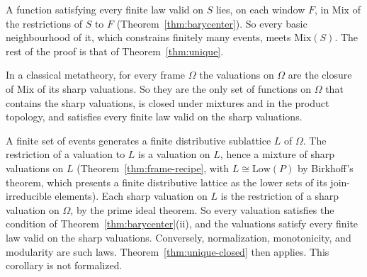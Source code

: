 \noindent
A function satisfying every finite law valid on $S$ lies, on each window
$F$, in $\mathrm{Mix}$ of the restrictions of $S$ to $F$
(Theorem~\ref{thm:barycenter}). So every basic neighbourhood of it,
which constrains finitely many events, meets
$\mathrm{Mix}(S)$. The rest of the proof
is that of Theorem~\ref{thm:unique}.

\begin{corollary}
\label{cor:frame-unique}
In a classical metatheory, for every frame $\Omega$ the valuations on
$\Omega$ are the closure of $\mathrm{Mix}$ of its sharp valuations. So
they are the only set of functions on $\Omega$ that contains the sharp
valuations, is closed under mixtures and in the product topology, and
satisfies every finite law valid on the sharp valuations.
\end{corollary}

\noindent
A finite set of events generates a finite distributive sublattice $L$
of $\Omega$. The restriction of a valuation to $L$ is a valuation on
$L$, hence a mixture of sharp valuations on $L$
(Theorem~\ref{thm:frame-recipe}, with $L \cong \mathrm{Low}(P)$ by
Birkhoff's theorem, which presents a finite distributive lattice as
the lower sets of its join-irreducible elements). Each sharp valuation on $L$ is the restriction of
a sharp valuation on $\Omega$, by the prime ideal theorem. So every
valuation satisfies the condition of Theorem~\ref{thm:barycenter}(ii),
and the valuations satisfy every finite law valid on the sharp
valuations. Conversely, normalization, monotonicity, and modularity are
such laws. Theorem~\ref{thm:unique-closed} then applies. This
corollary is not formalized.


